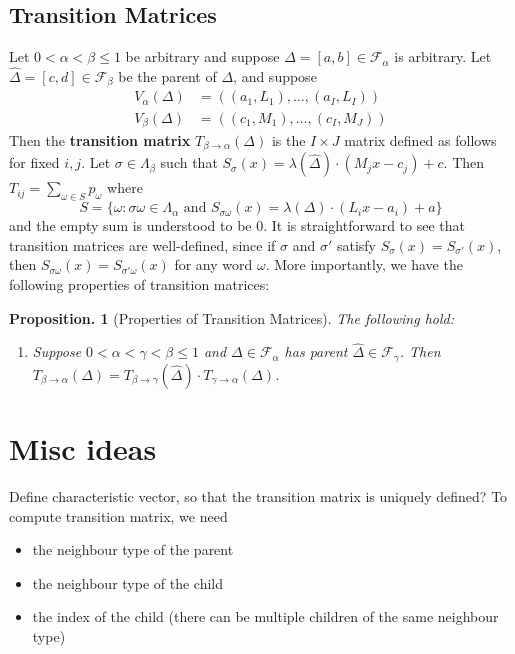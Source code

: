 \documentclass[11pt, a4paper]{memoir}
\theoremstyle{change}
\newtheorem{proposition}[theorem]{Proposition.}
\theoremstyle{plain}
\theoremstyle{nonumberplain}
\numberwithin{equation}{section}
\begin{document}
\subsection{Transition Matrices}
Let $0<\alpha<\beta\leq 1$ be arbitrary and suppose $\Delta=[a,b]\in\mathcal{F}_\alpha$ is arbitrary.
Let $\widehat\Delta=[c,d]\in\mathcal{F}_\beta$ be the parent of $\Delta$, and suppose
\begin{align*}
    V_\alpha(\Delta) &= ((a_1,L_1),\ldots,(a_I,L_I))\\
    V_\beta(\Delta) &= ((c_1,M_1),\ldots,(c_I,M_J))
\end{align*}
Then the \textbf{transition matrix} $T_{\beta\to\alpha}(\Delta)$ is the $I\times J$ matrix defined as follows for fixed $i,j$.
Let $\sigma\in\Lambda_\beta$ such that $S_\sigma(x)=\lambda(\widehat\Delta)\cdot (M_jx-c_j)+c$.
Then $T_{ij}=\sum_{\omega\in S}p_\omega$ where
\begin{equation*}
    S=\{\omega:\sigma\omega\in\Lambda_\alpha\text{ and }S_{\sigma\omega}(x)=\lambda(\Delta)\cdot(L_ix-a_i)+a\}
\end{equation*}
and the empty sum is understood to be 0.
It is straightforward to see that transition matrices are well-defined, since if $\sigma$ and $\sigma'$ satisfy $S_\sigma(x)=S_{\sigma'}(x)$, then $S_{\sigma\omega}(x)=S_{\sigma'\omega}(x)$ for any word $\omega$.
More importantly, we have the following properties of transition matrices:
\begin{proposition}[Properties of Transition Matrices]
    The following hold:
    \begin{enumerate}[nl,r]
        \item Suppose $0<\alpha<\gamma<\beta\leq 1$ and $\Delta\in\mathcal{F}_\alpha$ has parent $\widehat\Delta\in\mathcal{F}_\gamma$.
            Then $T_{\beta\to\alpha}(\Delta)=T_{\beta\to\gamma}(\widehat\Delta)\cdot T_{\gamma\to\alpha}(\Delta)$.
    \end{enumerate}
\end{proposition}
\section{Misc ideas}

Define characteristic vector, so that the transition matrix is uniquely defined?
To compute transition matrix, we need
\begin{itemize}
    \item the neighbour type of the parent
    \item the neighbour type of the child
    \item the index of the child (there can be multiple children of the same neighbour type)
\end{itemize}
\end{document}
